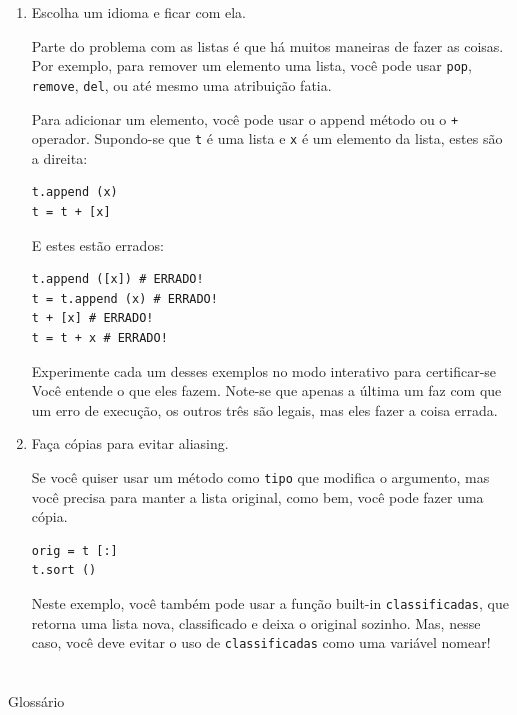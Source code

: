 \documentclass[10pt]{book}
\begin{document}
\begin{exercise}
\begin{enumerate}
\item Escolha um idioma e ficar com ela.

Parte do problema com as listas é que há muitos
maneiras de fazer as coisas. Por exemplo, para remover um elemento
uma lista, você pode usar {\tt pop}, {\tt remove}, {\tt del},
ou até mesmo uma atribuição fatia.

Para adicionar um elemento, você pode usar o {\tt} append método ou
o {\tt +} operador. Supondo-se que {\tt t} é uma lista e
{\tt x} é um elemento da lista, estes são a direita: 

\begin{verbatim}
t.append (x)
t = t + [x]
\end{verbatim}

E estes estão errados:

\begin{verbatim}
t.append ([x]) # ERRADO!
t = t.append (x) # ERRADO!
t + [x] # ERRADO!
t = t + x # ERRADO!
\end{verbatim}

Experimente cada um desses exemplos no modo interativo para certificar-se
Você entende o que eles fazem. Note-se que apenas a última
um faz com que um erro de execução, os outros três são legais, mas eles
fazer a coisa errada.


\item Faça cópias para evitar aliasing.

Se você quiser usar um método como {\tt tipo} que modifica
o argumento, mas você precisa para manter a lista original, como
bem, você pode fazer uma cópia.

\begin{verbatim}
orig = t [:]
t.sort ()
\end{verbatim}

Neste exemplo, você também pode usar a função built-in {\tt classificadas},
que retorna uma lista nova, classificado e deixa o original sozinho.
Mas, nesse caso, você deve evitar o uso de {\tt classificadas} como uma variável
nomear!

\end{enumerate}



\section{} Glossário

\begin{description}


\end{description}
\end{exercise}
\end{document}
